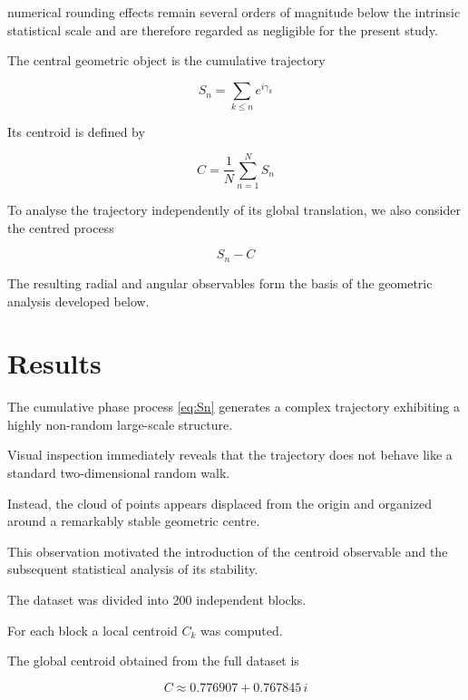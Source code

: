 \documentclass[11pt]{amsart}
\theoremstyle{definition}
\theoremstyle{remark}
\begin{document}
numerical rounding effects remain several orders of
magnitude below the intrinsic statistical scale and are
therefore regarded as negligible for the present study.

The central geometric object is the cumulative trajectory

\begin{equation}
S_n
=
\sum_{k\le n}
e^{i\gamma_k}
\label{eq:Sn}
\end{equation}

Its centroid is defined by

\begin{equation}
C
=
\frac1N
\sum_{n=1}^{N}
S_n
\label{eq:C}
\end{equation}

To analyse the trajectory independently of its global
translation, we also consider the centred process

\begin{equation}
S_n-C
\label{eq:centered}
\end{equation}

The resulting radial and angular observables form the
basis of the geometric analysis developed below.

\section{Results}

The cumulative phase process \eqref{eq:Sn}
generates a complex trajectory exhibiting a highly
non-random large-scale structure.

Visual inspection immediately reveals that the trajectory
does not behave like a standard two-dimensional random
walk.

Instead, the cloud of points appears displaced from the
origin and organized around a remarkably stable geometric
centre.

This observation motivated the introduction of the
centroid observable and the subsequent statistical
analysis of its stability.

The dataset was divided into 200 independent blocks.

For each block a local centroid \(C_k\)  was computed.

The global centroid obtained from the full dataset is

\begin{equation}
C
\approx
0.776907
+
0.767845\,i
\label{eq:Cvalue}
\end{equation}
\end{document}
